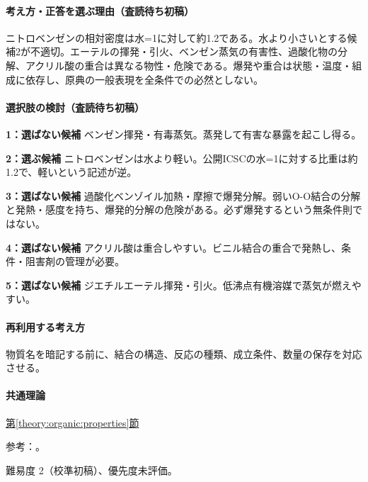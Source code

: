 \paragraph{考え方・正答を選ぶ理由（査読待ち初稿）} ニトロベンゼンの相対密度は水=1に対して約1.2である。水より小さいとする候補2が不適切。エーテルの揮発・引火、ベンゼン蒸気の有害性、過酸化物の分解、アクリル酸の重合は異なる物性・危険である。爆発や重合は状態・温度・組成に依存し、原典の一般表現を全条件での必然としない。

\paragraph{選択肢の検討（査読待ち初稿）}\mbox{}\par

\noindent\textbf{1：選ばない候補} ベンゼン揮発・有毒蒸気。蒸発して有害な暴露を起こし得る。\par

\noindent\textbf{2：選ぶ候補} ニトロベンゼンは水より軽い。公開ICSCの水=1に対する比重は約1.2で、軽いという記述が逆。\par

\noindent\textbf{3：選ばない候補} 過酸化ベンゾイル加熱・摩擦で爆発分解。弱いO-O結合の分解と発熱・感度を持ち、爆発的分解の危険がある。必ず爆発するという無条件則ではない。\par

\noindent\textbf{4：選ばない候補} アクリル酸は重合しやすい。ビニル結合の重合で発熱し、条件・阻害剤の管理が必要。\par

\noindent\textbf{5：選ばない候補} ジエチルエーテル揮発・引火。低沸点有機溶媒で蒸気が燃えやすい。\par

\paragraph{再利用する考え方} 物質名を暗記する前に、結合の構造、反応の種類、成立条件、数量の保存を対応させる。

\paragraph{共通理論} \hyperref[theory:organic:properties]{第\ref*{theory:organic:properties}節}

\par 参考：\cite{organic_nitro,organic_peroxide}。

\par 難易度 2（校準初稿）、優先度未評価。

